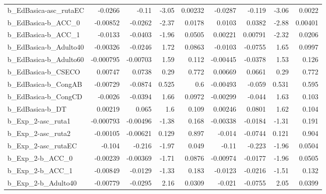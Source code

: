 \begin{tabular}{lrrrrrrrr}
b\_EdBasica-asc\_rutaEC      &     -0.0266 &        -0.11 &    -3.05 &  0.00232 &    -0.0287 &      -0.119 &        -3.06 &        0.0022 \\
b\_EdBasica-b\_ACC\_0         &    -0.00852 &      -0.0262 &    -2.37 &   0.0178 &     0.0103 &      0.0382 &        -2.88 &       0.00401 \\
b\_EdBasica-b\_ACC\_1         &     -0.0133 &      -0.0403 &    -1.96 &   0.0505 &    0.00221 &     0.00791 &        -2.32 &        0.0206 \\
b\_EdBasica-b\_Adulto40      &    -0.00326 &      -0.0246 &     1.72 &   0.0863 &    -0.0103 &     -0.0755 &         1.65 &        0.0997 \\
b\_EdBasica-b\_Adulto60      &   -0.000795 &     -0.00703 &     1.59 &    0.112 &   -0.00445 &     -0.0378 &         1.53 &         0.126 \\
b\_EdBasica-b\_CSECO         &     0.00747 &       0.0738 &     0.29 &    0.772 &    0.00669 &      0.0661 &         0.29 &         0.772 \\
b\_EdBasica-b\_CongAB        &    -0.00729 &      -0.0874 &    0.525 &      0.6 &   -0.00493 &      -0.059 &        0.531 &         0.595 \\
b\_EdBasica-b\_CongCD        &     -0.0026 &      -0.0394 &     1.66 &   0.0972 &   -0.00299 &      -0.044 &         1.63 &         0.103 \\
b\_EdBasica-b\_DT            &     0.00219 &        0.065 &      1.6 &    0.109 &    0.00246 &      0.0801 &         1.62 &         0.104 \\
b\_Exp\_2-asc\_ruta1          &   -0.000793 &     -0.00496 &    -1.38 &    0.168 &   -0.00338 &     -0.0184 &        -1.31 &         0.191 \\
b\_Exp\_2-asc\_ruta2          &    -0.00105 &     -0.00621 &    0.129 &    0.897 &     -0.014 &     -0.0744 &        0.121 &         0.904 \\
b\_Exp\_2-asc\_rutaEC         &      -0.104 &       -0.216 &    -1.97 &    0.049 &      -0.11 &      -0.223 &        -1.96 &        0.0504 \\
b\_Exp\_2-b\_ACC\_0            &    -0.00239 &     -0.00369 &    -1.71 &   0.0876 &   -0.00974 &     -0.0177 &        -1.96 &        0.0505 \\
b\_Exp\_2-b\_ACC\_1            &    -0.00849 &      -0.0129 &    -1.33 &    0.183 &    -0.0123 &     -0.0216 &        -1.51 &         0.132 \\
b\_Exp\_2-b\_Adulto40         &    -0.00779 &      -0.0295 &     2.16 &   0.0309 &     -0.021 &     -0.0755 &         2.05 &        0.0399 \\

\end{tabular}
